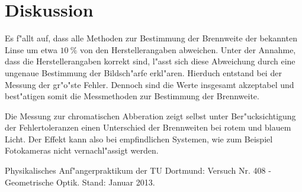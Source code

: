 \clearpage
\section{Diskussion}
	\label{sec:diskussion}
	Es f"allt auf, dass alle Methoden zur Bestimmung der Brennweite der bekannten Linse um etwa $\SI{10}{\percent}$ von den Herstellerangaben abweichen.
	Unter der Annahme, dass die Herstellerangaben korrekt sind, l"asst sich diese Abweichung durch eine ungenaue Bestimmung der Bildsch"arfe erkl"aren.
	Hierduch entstand bei der Messung der gr"o"ste Fehler.
	Dennoch sind die Werte insgesamt akzeptabel und best"atigen somit die Messmethoden zur Bestimmung der Brennweite.

	Die Messung zur chromatischen Abberation zeigt selbst unter Ber"ucksichtigung der Fehlertoleranzen einen Unterschied der Brennweiten bei rotem und blauem Licht.
	Der Effekt kann also bei empfindlichen Systemen, wie zum Beispiel Fotokameras nicht vernachl"assigt werden.

	\begin{thebibliography}{9}
	\label{sec:literaturverzeichnis}
		 Physikalisches Anf"angerpraktikum der TU Dortmund: Versuch Nr. 408 - Geometrische Optik. Stand: Januar 2013.
	\end{thebibliography}
